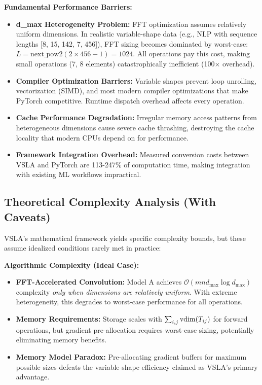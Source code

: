 \textbf{Fundamental Performance Barriers:}
\begin{itemize}[leftmargin=1.5em]
\item \textbf{d\_max Heterogeneity Problem:} FFT optimization assumes relatively uniform dimensions. In realistic variable-shape data (e.g., NLP with sequence lengths [8, 15, 142, 7, 456]), FFT sizing becomes dominated by worst-case: $L = \text{next\_pow2}(2 \times 456 - 1) = 1024$. All operations pay this cost, making small operations (7, 8 elements) catastrophically inefficient (100× overhead).

\item \textbf{Compiler Optimization Barriers:} Variable shapes prevent loop unrolling, vectorization (SIMD), and most modern compiler optimizations that make PyTorch competitive. Runtime dispatch overhead affects every operation.

\item \textbf{Cache Performance Degradation:} Irregular memory access patterns from heterogeneous dimensions cause severe cache thrashing, destroying the cache locality that modern CPUs depend on for performance.

\item \textbf{Framework Integration Overhead:} Measured conversion costs between VSLA and PyTorch are 113-247\% of computation time, making integration with existing ML workflows impractical.
\end{itemize}

\subsection{Theoretical Complexity Analysis (With Caveats)}

VSLA's mathematical framework yields specific complexity bounds, but these assume idealized conditions rarely met in practice:

\textbf{Algorithmic Complexity (Ideal Case):}
\begin{itemize}[leftmargin=1.5em]
\item \textbf{FFT-Accelerated Convolution:} Model A achieves $\mathcal{O}(mn d_{\max} \log d_{\max})$ complexity \textit{only when dimensions are relatively uniform}. With extreme heterogeneity, this degrades to worst-case performance for all operations.
\item \textbf{Memory Requirements:} Storage scales with $\sum_{i,j} \operatorname{vdim}(T_{ij})$ for forward operations, but gradient pre-allocation requires worst-case sizing, potentially eliminating memory benefits.
\item \textbf{Memory Model Paradox:} Pre-allocating gradient buffers for maximum possible sizes defeats the variable-shape efficiency claimed as VSLA's primary advantage.
\end{itemize}


